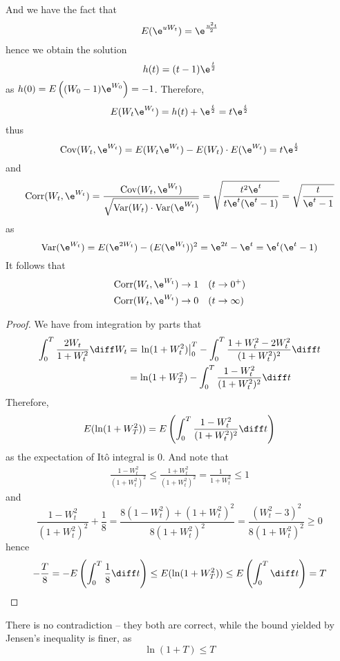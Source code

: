     And we have the fact that
    \[E(\e^{uW_t})=\e^{\frac{u^2t}2}\]
    hence we obtain the solution
    \[h(t)=(t-1)\e^{\frac{t}{2}}\]
    as $h(0)=E\left((W_0-1)\e^{W_0}\right)=-1$.
    Therefore,
    \[E(W_t\e^{W_t})=h(t)+\e^{\frac{t}{2}}=t\e^{\frac{t}{2}}\]
    thus
    \def\cov{\mathrm{Cov}}
    \def\var{\mathrm{Var}}
    \def\corr{\mathrm{Corr}}
    \[\cov(W_t,\e^{W_t})=E(W_t\e^{W_t})-E(W_t)\cdot E(\e^{W_t})
    =t\e^{\frac{t}{2}}\]
    and
    \[\corr(W_t,\e^{W_t})=\frac{\cov(W_t,\e^{W_t})}%
    {\sqrt{\var(W_t)\cdot\var(\e^{W_t})}}
    =\sqrt{\frac{t^2\e^t}{t\e^t(\e^t-1)}}
    =\sqrt{\frac{t}{\e^t-1}}\]
    as
    \[\var(\e^{W_t})=E(\e^{2W_t})-(E(\e^{W_t}))^2
    =\e^{2t}-\e^t=
    \e^t(\e^t-1)\]
    It follows that
    \[\begin{aligned}
        \corr(W_t,\e^{W_t})&\to 1\quad(t\to 0^+)\\
        \corr(W_t,\e^{W_t})&\to 0\quad(t\to \infty)
    \end{aligned}\]

    \problem
    \begin{proof}
        We have from integration by parts that
        \[\begin{aligned}
            \int_0^T\frac{2W_t}{1+W_t^2}\diff W_t
            &=\left.\ln(1+W_t^2)\right|_0^T
            -\int_0^T\frac{1+W_t^2-2W_t^2}{(1+W_t^2)^2}\diff t\\
            &=\ln(1+W_T^2)-\int_0^T\frac{1-W_t^2}{(1+W_t^2)^2}\diff t
        \end{aligned}\]
        Therefore,
        \[E(\ln(1+W_T^2))=E\left(
            \int_0^T\frac{1-W^2_t}{(1+W_t^2)^2}\diff t
        \right)\]
        as the expectation of It\^o integral is 0.
        And note that
        \[\begin{aligned}
            \frac{1-W_t^2}{(1+W_t^2)^2}\leq\frac{1+W_t^2}{(1+W_t^2)^2}
            =\frac{1}{1+W_t^2}\leq 1
        \end{aligned}\]
        and
        \[\frac{1-W_t^2}{(1+W_t^2)^2}+\frac{1}{8}
        =\frac{8(1-W_t^2)+(1+W_t^2)^2}{8(1+W_t^2)^2}
        =\frac{(W_t^2-3)^2}{8(1+W_t^2)^2}\geq 0\]
        hence
        \[-\frac{T}{8}=-E\left(\int_0^T\frac{1}{8}\diff t\right)
        \leq E(\ln(1+W_T^2))
        \leq E\left(\int_0^T\diff t\right)=T\]
    \end{proof}
    There is no contradiction -- they both are correct, while the
    bound yielded by Jensen's inequality is finer, as
    \[\ln(1+T)\leq T\]

